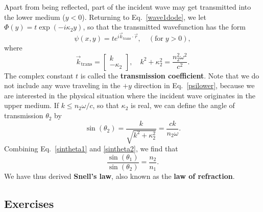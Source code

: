 \documentclass[10pt,a4paper]{article}
\begin{document}
Apart from being reflected, part of the incident wave may get
transmitted into the lower medium ($y < 0$).  Returning to
Eq.~\eqref{wave1dode}, we let $\Phi(y) = t \exp(-i\kappa_2y)$, so that
the transmitted wavefunction has the form
\begin{equation}
  \psi(x,y) = t e^{i\vec{k}_{\mathrm{trans}}\cdot \vec{r}}, \quad(\textrm{for} \; y > 0),
  \label{psilower}
\end{equation}
where
\begin{equation}
  \vec{k}_{\mathrm{trans}} =
  \begin{bmatrix}k \\ -\kappa_2 \end{bmatrix}, \quad
  k^2 + \kappa_2^2 = \frac{n_2^2\omega^2}{c^2}.
\end{equation}
The complex constant $t$ is called the \textbf{transmission
  coefficient}.  Note that we do not include any wave traveling in the
$+y$ direction in Eq.~\eqref{psilower}, because we are interested in
the physical situation where the incident wave originates in the upper
medium.  If $k \le n_2 \omega / c$, so that $\kappa_2$ is real, we can
define the angle of transmission $\theta_2$ by
\begin{equation}
  \sin(\theta_2) = \frac{k}{\sqrt{k^2 + \kappa_2^2}} =
  \frac{ck}{n_2\omega}.
  \label{sintheta2}
\end{equation}
Combining Eq.~\eqref{sintheta1} and \eqref{sintheta2}, we find that
\begin{equation}
  \frac{\sin(\theta_1)}{\sin(\theta_2)} = \frac{n_2}{n_1}.
\end{equation}
We have thus derived \textbf{Snell's law}, also known as the
\textbf{law of refraction}.

\subsection{Exercises}
\label{exercises}
\end{document}
